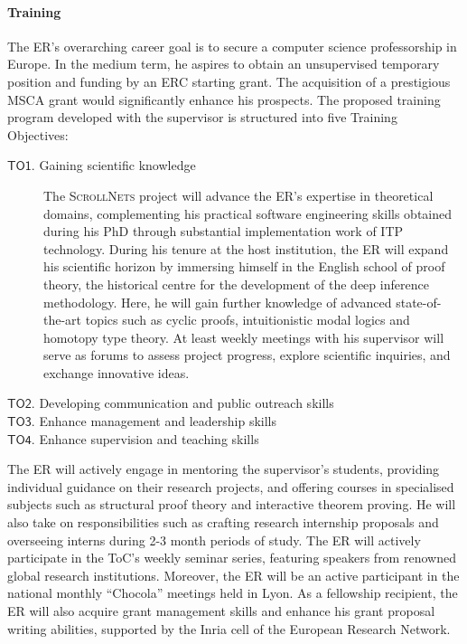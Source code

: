 \documentclass[12pt,draftproposal]{msca-pf}
\newcommand{\proj}{\small\textsc{ScrollNets}}
\newcommand{\TO}[1]{$\mathsf{TO#1}$}
\begin{document}
\paragraph{Training}
The ER's overarching career goal is to secure a computer science professorship in Europe. In the
medium term, he aspires to obtain an unsupervised temporary position and funding by an ERC starting
grant. The acquisition of a prestigious MSCA grant would significantly enhance his prospects. The
proposed training program developed with the supervisor is structured into five Training Objectives:
\begin{description}
    \item[\TO{1}. Gaining scientific knowledge]
    The {\proj} project will advance the ER's expertise in theoretical domains, complementing his
    practical software engineering skills obtained during his PhD through substantial implementation
    work of ITP technology. During his tenure at the host institution, the ER will expand his
    scientific horizon by immersing himself in the English school of proof theory, the historical
    centre for the development of the deep inference methodology. Here, he will gain further
    knowledge of advanced state-of-the-art topics such as cyclic proofs, intuitionistic modal logics
    and homotopy type theory. At least weekly meetings with his supervisor will serve as forums to
    assess project progress, explore scientific inquiries, and exchange innovative ideas.
    
    \item[\TO{2}. Developing communication and public outreach skills]

    \item[\TO{3}. Enhance management and leadership skills]

    \item[\TO{4}. Enhance supervision and teaching skills]

\end{description}   The ER will actively engage
in mentoring the supervisor's students, providing individual guidance on their research projects,
and offering courses in specialised subjects such as structural proof theory and interactive theorem
proving. He will also take on responsibilities such as crafting research internship proposals and
overseeing interns during 2-3 month periods of study. The ER will actively participate in the ToC's
weekly seminar series, featuring speakers from renowned global research institutions. Moreover, the
ER will be an active participant in the national monthly “Chocola” meetings held in Lyon. As a
fellowship recipient, the ER will also acquire grant management skills and enhance his grant
proposal writing abilities, supported by the Inria cell of the European Research Network.
\end{document}

